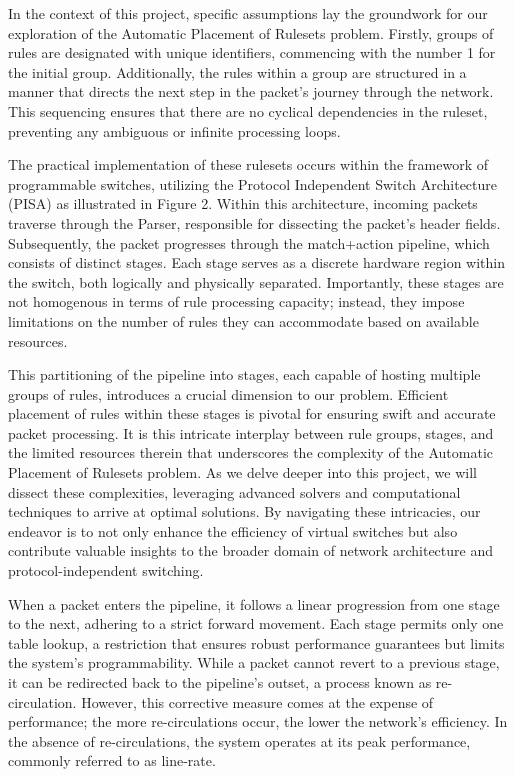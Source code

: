 In the context of this project, specific assumptions lay the groundwork for our exploration of the Automatic Placement of Rulesets problem. Firstly, groups of rules are designated with unique identifiers, commencing with the number 1 for the initial group. Additionally, the rules within a group are structured in a manner that directs the next step in the packet's journey through the network. This sequencing ensures that there are no cyclical dependencies in the ruleset, preventing any ambiguous or infinite processing loops.

The practical implementation of these rulesets occurs within the framework of programmable switches, utilizing the Protocol Independent Switch Architecture (PISA) as illustrated in Figure 2. Within this architecture, incoming packets traverse through the Parser, responsible for dissecting the packet's header fields. Subsequently, the packet progresses through the match+action pipeline, which consists of distinct stages. Each stage serves as a discrete hardware region within the switch, both logically and physically separated. Importantly, these stages are not homogenous in terms of rule processing capacity; instead, they impose limitations on the number of rules they can accommodate based on available resources.

This partitioning of the pipeline into stages, each capable of hosting multiple groups of rules, introduces a crucial dimension to our problem. Efficient placement of rules within these stages is pivotal for ensuring swift and accurate packet processing. It is this intricate interplay between rule groups, stages, and the limited resources therein that underscores the complexity of the Automatic Placement of Rulesets problem. As we delve deeper into this project, we will dissect these complexities, leveraging advanced solvers and computational techniques to arrive at optimal solutions. By navigating these intricacies, our endeavor is to not only enhance the efficiency of virtual switches but also contribute valuable insights to the broader domain of network architecture and protocol-independent switching.

When a packet enters the pipeline, it follows a linear progression from one stage to the next, adhering to a strict forward movement. Each stage permits only one table lookup, a restriction that ensures robust performance guarantees but limits the system's programmability. While a packet cannot revert to a previous stage, it can be redirected back to the pipeline's outset, a process known as re-circulation. However, this corrective measure comes at the expense of performance; the more re-circulations occur, the lower the network's efficiency. In the absence of re-circulations, the system operates at its peak performance, commonly referred to as line-rate.
